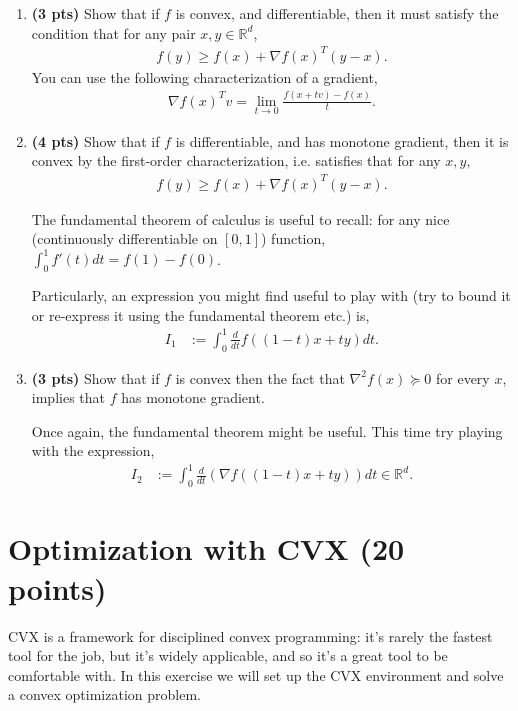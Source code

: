 \begin{enumerate}
\item \textbf{(3 pts)} Show that if $f$ is convex, and differentiable, then it must 
satisfy the condition that for any pair $x,y \in \mathbb{R}^d$, 
\begin{align*}
f(y) \geq f(x) + \nabla f(x)^T (y - x). 
\end{align*}
You can use the following characterization of a gradient,
\begin{align*}
\nabla f(x)^T v = \lim_{t \rightarrow 0} \frac{f(x + t v) - f(x)}{t}. 
\end{align*}

\item \textbf{(4 pts)} Show that if $f$ is differentiable, and has monotone gradient, then it is convex by the first-order characterization, i.e. satisfies that for any $x,y,$\begin{align*}
f(y) \geq f(x) +  \nabla f(x)^T (y - x). 
\end{align*}

The fundamental theorem of calculus is useful to recall: for any nice (continuously differentiable on $[0,1]$) function, $\int_{0}^1 f'(t) dt = f(1) - f(0)$. 

Particularly, an expression you might find useful to play with (try to bound it or re-express it using the fundamental theorem etc.) is,
\begin{align*}
I_1 &:= \int_0^1 \frac{d}{dt} f( (1-t)x + ty) dt.
\end{align*}

\item \textbf{(3 pts)} Show that if $f$ is convex then the fact that $\nabla^2 f(x) \succeq 0$ for every $x$, implies that $f$ has monotone gradient. 

Once again, the fundamental theorem might be useful. This time try playing with the expression,
\begin{align*}
I_2 &:= \int_0^1 \frac{d}{dt} \left( \nabla f( (1-t)x + ty) \right) dt \in \mathbb{R}^d. 
\end{align*}

\end{enumerate}



\newpage
\section{Optimization with CVX (20 points)}
CVX is a framework for disciplined convex programming: it's rarely
the fastest tool for the job, but it's widely applicable, and so it's a great
tool to be comfortable with. In this exercise we will set up the CVX
environment and solve a convex optimization problem.

